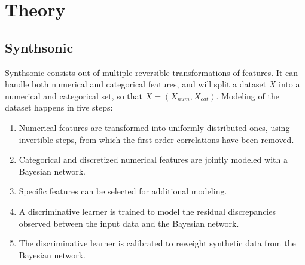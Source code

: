 
\section{Theory}

\subsection{Synthsonic}

Synthsonic consists out of multiple reversible transformations of features. It can handle both numerical and categorical features, and will split a dataset $X$ into a numerical and categorical set, so that $X = (X_{num}, X_{cat})$. Modeling of the dataset happens in five steps:

\begin{enumerate}
    \item Numerical features are transformed into uniformly distributed ones, using invertible steps, from which the first-order correlations have been removed.
    \item Categorical and discretized numerical features are jointly modeled with a Bayesian network.
    \item Specific features can be selected for additional modeling.
    \item A discriminative learner is trained to model the residual discrepancies observed between the input data and the Bayesian network.
    \item The discriminative learner is calibrated to reweight synthetic data from the Bayesian network.
\end{enumerate}

